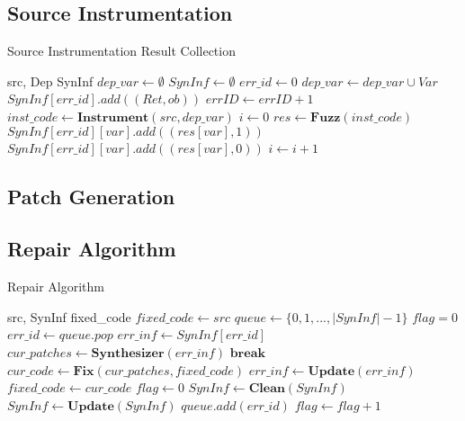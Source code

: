 \documentclass[a4j,dvipdfmx]{article}
\begin{document}
\subsection{Source Instrumentation}


 \begin{algorithm}
 \caption{Source Instrumentation Result Collection}
 \label{srcinst}
 \begin{algorithmic}[1]
 \renewcommand{\algorithmicrequire}{\textbf{Input:}}
 \renewcommand{\algorithmicensure}{\textbf{Output:}}
 \REQUIRE src, Dep
 \ENSURE  SynInf
  \STATE $dep\_var \gets \emptyset$
  \STATE $SynInf \gets \emptyset$
  \STATE $err\_id \gets 0$
   \STATE $dep\_var \gets dep\_var \cup Var$
   \STATE $SynInf[err\_id].add((Ret,ob))$
   \STATE $errID \gets errID + 1$
  \ENDFOR
  \STATE $inst\_code \gets \textbf{Instrument}(src, dep\_var)$
  \STATE $i \gets 0$
   \STATE $res \gets \textbf{Fuzz}(inst\_code)$
      \STATE $SynInf[err\_id][var].add((res[var],1))$
     \ELSE
      \STATE $SynInf[err\_id][var].add((res[var],0))$
     \ENDIF
     \ENDFOR
    \ENDFOR
   \STATE $i\gets i + 1$
  \ENDWHILE
 \end{algorithmic} 
 \end{algorithm}

\subsection{Patch Generation}
\subsection{Repair Algorithm}
\label{repair}

 \begin{algorithm}
 \caption{Repair Algorithm}
 \label{repalgo}
 \begin{algorithmic}[1]
 \renewcommand{\algorithmicrequire}{\textbf{Input:}}
 \renewcommand{\algorithmicensure}{\textbf{Output:}}
 \REQUIRE src, SynInf
 \ENSURE  fixed\_code
  \STATE $fixed\_code \gets src$
  \STATE $queue \gets \{0,1,...,|SynInf|-1\}$
  \STATE $flag = 0$
   \STATE $err\_id \gets queue.pop$
   \STATE $err\_inf \gets SynInf[err\_id]$
   \REPEAT
    \STATE $cur\_patches \gets \textbf{Synthesizer}(err\_inf)$
     \STATE $\textbf{break}$
    \ENDIF
    \STATE $cur\_code \gets \textbf{Fix}(cur\_patches,fixed\_code)$
     \STATE $err\_inf \gets \textbf{Update}(err\_inf)$
    \ENDIF
    \STATE $fixed\_code \gets cur\_code$
    \STATE $flag \gets 0$
     \STATE $SynInf \gets \textbf{Clean}(SynInf)$
     \STATE $SynInf \gets \textbf{Update}(SynInf)$
    \ENDIF
   \ELSE
    \STATE $queue.add(err\_id)$
    \STATE $flag \gets flag + 1$
   \ENDIF
  \ENDWHILE  
 \end{algorithmic} 
 \end{algorithm}
\end{document}
